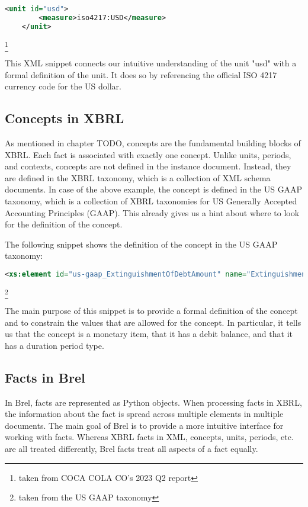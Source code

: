 \begin{lstlisting}[language=XML]
    <unit id="usd">
        <measure>iso4217:USD</measure>
    </unit>
\end{lstlisting}\footnote[3]{taken from COCA COLA CO's 2023 Q2 report}

This XML snippet connects our intuitive understanding of the unit "usd" with a formal definition of the unit.
It does so by referencing the official ISO 4217 currency code for the US dollar.

\subsection{Concepts in XBRL}

As mentioned in chapter TODO, concepts are the fundamental building blocks of XBRL.
Each fact is associated with exactly one concept.
Unlike units, periods, and contexts, concepts are not defined in the instance document.
Instead, they are defined in the XBRL taxonomy, which is a collection of XML schema documents.
In case of the above example, the concept is defined in the US GAAP taxonomy, which is a collection of XBRL taxonomies for US Generally Accepted Accounting Principles (GAAP).
This already gives us a hint about where to look for the definition of the concept.

The following snippet shows the definition of the concept in the US GAAP taxonomy:

\begin{lstlisting}[language=XML]
    <xs:element id="us-gaap_ExtinguishmentOfDebtAmount" name="ExtinguishmentOfDebtAmount" nillable="true" substitutionGroup="xbrli:item" type="xbrli:monetaryItemType" xbrli:balance="debit" xbrli:periodType="duration"/>
\end{lstlisting}\footnote[4]{taken from the US GAAP taxonomy}

The main purpose of this snippet is to provide a formal definition of the concept and to constrain the values that are allowed for the concept.
In particular, it tells us that the concept is a monetary item, that it has a debit balance, and that it has a duration period type.

\subsection{Facts in Brel}

In Brel, facts are represented as Python objects. 
When processing facts in XBRL, the information about the fact is spread across multiple elements in multiple documents.
The main goal of Brel is to provide a more intuitive interface for working with facts.
Whereas XBRL facts in XML, concepts, units, periods, etc. are all treated differently, Brel facts treat all aspects of a fact equally.